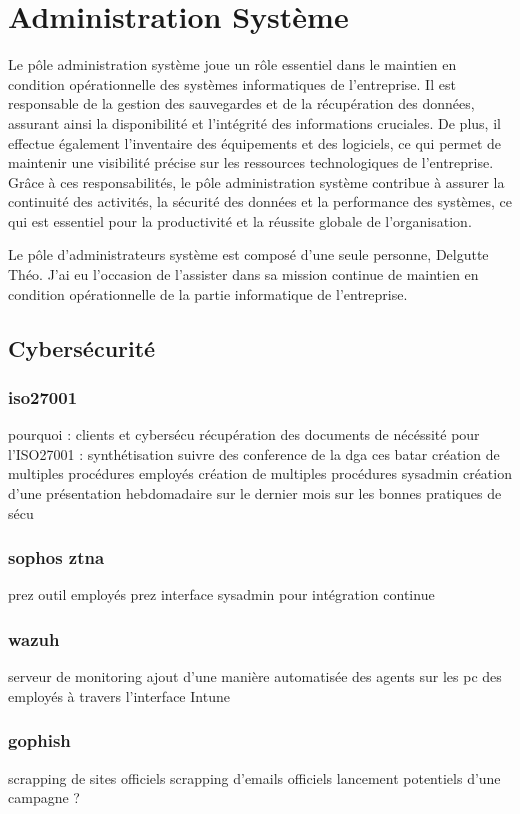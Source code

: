 \section{Administration Système}
Le pôle administration système joue un rôle essentiel dans le maintien en condition opérationnelle des systèmes informatiques de l'entreprise.
Il est responsable de la gestion des sauvegardes et de la récupération des données, assurant ainsi la disponibilité et l'intégrité des informations cruciales.
De plus, il effectue également l'inventaire des équipements et des logiciels, ce qui permet de maintenir une visibilité précise sur les ressources technologiques de l'entreprise.
Grâce à ces responsabilités, le pôle administration système contribue à assurer la continuité des activités, la sécurité des données et la performance des systèmes, ce qui est essentiel pour la productivité et la réussite globale de l'organisation.

Le pôle d'administrateurs système est composé d'une seule personne, Delgutte Théo.
J'ai eu l'occasion de l'assister dans sa mission continue de maintien en condition opérationnelle de la partie informatique de l'entreprise.

\subsection{Cybersécurité}
\subsubsection{iso27001}
pourquoi : clients et cybersécu
récupération des documents de nécéssité pour l'ISO27001 : synthétisation
suivre des conference de la dga ces batar
création de multiples procédures employés
création de multiples procédures sysadmin
création d'une présentation hebdomadaire sur le dernier mois sur les bonnes pratiques de sécu
\subsubsection{sophos ztna}
prez outil employés
prez interface sysadmin pour intégration continue   
\subsubsection{wazuh}
serveur de monitoring
ajout d'une manière automatisée des agents sur les pc des employés à travers l'interface Intune
\subsubsection{gophish}
scrapping de sites officiels
scrapping d'emails officiels
lancement potentiels d'une campagne ?

